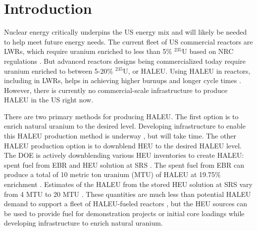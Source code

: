 \section{Introduction}
Nuclear energy critically underpins the US  
energy mix and 
will likely be needed to help meet future energy needs. 
The current 
fleet of US commercial reactors are \glspl*{LWR}, 
which require uranium enriched to less than 5\% $^{235}$U
based on \gls*{NRC} regulations \cite{noauthor_10_2006}.
But advanced reactors designs being commercialized 
today  require 
uranium enriched to between 5-20\% $^{235}$U, or \gls*{HALEU}. 
Using \gls*{HALEU} in reactors, including in \glspl*{LWR}, 
helps in achieving higher burnups and longer cycle 
times \cite{carlson_implications_2022}.
However, there is currently no commercial-scale infrastructure to 
produce \gls*{HALEU} in the US right now. 

There are two primary methods for producing \gls*{HALEU}. The first 
option is to enrich natural uranium to the desired level. Developing 
infrastructure to enable this \gls*{HALEU} production method 
is underway 
\cite{nuclear_energy_institute_establishing_2022,us_nuclear_regulatory_commission_centrus_2021},
but will take time. 
The other \gls*{HALEU} production option is to downblend \gls*{HEU} to 
the desired \gls*{HALEU}
level. The \gls*{DOE} is actively downblending various \gls*{HEU} inventories
to create \gls*{HALEU}: spent fuel from \gls*{EBR} and \gls*{HEU} solution 
at \gls*{SRS} \cite{nuclear_energy_institute_establishing_2022}. The 
spent fuel from \gls*{EBR} can produce a total of 10 metric ton uranium (MTU) 
of \gls*{HALEU} at 19.75\% enrichment 
\cite{nuclear_energy_institute_establishing_2022}. 
Estimates of the \gls*{HALEU} from the stored \gls*{HEU} solution 
at \gls*{SRS} vary from 4 MTU \cite{nuclear_energy_institute_establishing_2022} 
to 20 MTU \cite{regalbuto_addressing_2020}.
These quantities are much less than potential \gls*{HALEU} demand 
to support a fleet of \gls*{HALEU}-fueled reactors 
\cite{dixon_estimated_2022,bachmann_enrichment_2021}, but the \gls*{HEU} 
sources can be used to provide fuel for demonstration 
projects or initial core loadings while developing infrastructure 
to enrich natural uranium. 


